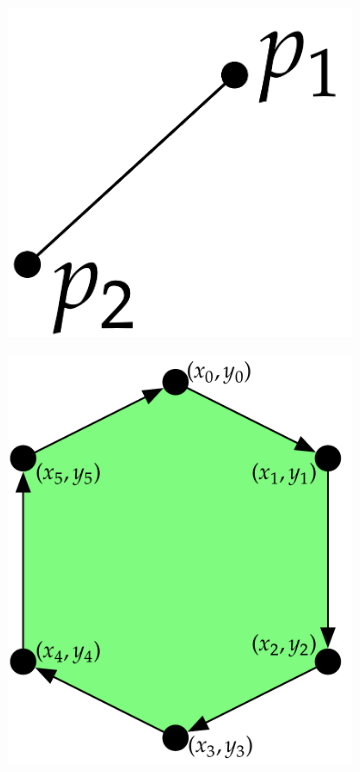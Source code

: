 \begin{figure}
\centering
\begin{subfigure}[b]{0.2\linewidth}
\includegraphics[width=\linewidth]{figs/line.pdf}
\caption{}%
\label{subfig:line}
\end{subfigure}
\quad
\begin{subfigure}[b]{0.3\linewidth}
\includegraphics[width=\linewidth]{figs/loop.pdf}

\end{subfigure}
\end{figure}
